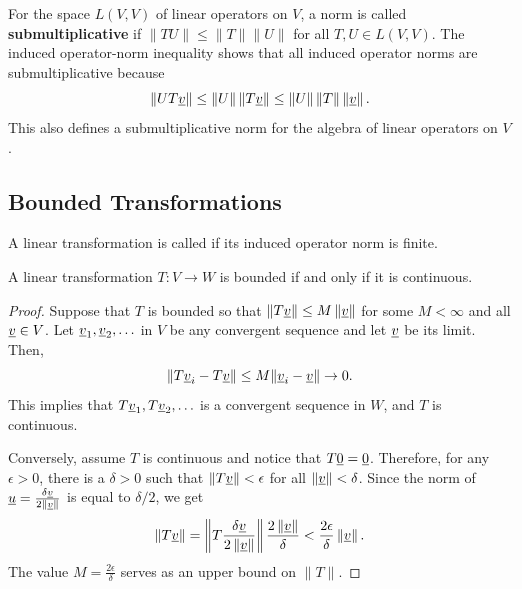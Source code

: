 For the space $L(V,V)$ of linear operators on $V$, a norm is called \textbf{submultiplicative} if $\| T U \| \leq \|T\| \|U\|$ for all $T,U \in L(V,V)$.
The induced operator-norm inequality shows that all induced operator norms are submultiplicative because
\begin{equation*}
\left\| U T \underline{v} \right\| \leq \left\| U \right\| \left\| T \underline{v} \right\| \leq \left\| U \right\| \left\| T \right\| \left\| \underline{v} \right\| .
\end{equation*}
This also defines a submultiplicative norm for the algebra of linear operators on $V$.

\subsection{Bounded Transformations}

\begin{definition}
A linear transformation is called  if its induced operator norm is finite.
\end{definition}

\begin{theorem}
A linear transformation $T \colon V \rightarrow W$ is bounded if and only if it is continuous.
\end{theorem}
\begin{proof}
Suppose that $T$ is bounded so that $\left\| T \underline{v} \right\| \leq M \left\| \underline{v} \right\|$ for some $M<\infty$ and all $\underline{v} \in V$.
Let $\underline{v}_1, \underline{v}_2, \ldots$ in $V$ be any convergent sequence and let $\underline{v}$ be its limit.
Then,
\[ \| T\underline v_i-T\underline v\|\le M\|\underline v_i-\underline v\|\to0 . \]
This implies that $T \underline{v}_1, T \underline{v}_2, \ldots$ is a convergent sequence in $W$, and $T$ is continuous.

Conversely, assume $T$ is continuous and notice that $T \underline{0} = \underline{0}$.
Therefore, for any $\epsilon > 0$, there is a $\delta>0$ such that $\| T \underline{v} \| < \epsilon$ for all $\| \underline{v} \| < \delta$.
Since the norm of $\underline{u} = \frac{ \delta \underline{v} }{2 \left\| \underline{v} \right\| }$ is equal to $\delta/2$, we get
\begin{equation*}
\left\| T \underline{v} \right\|
= \left\| T \frac{ \delta \underline{v} }{2 \left\| \underline{v} \right\| } \right\|
\frac{ 2 \left\| \underline{v} \right\| }{ \delta }
< \frac{2 \epsilon}{ \delta } \left\| \underline{v} \right\|.
\end{equation*}
The value $M = \frac{2 \epsilon}{\delta}$ serves as an upper bound on $\|T\|$.
\end{proof}

